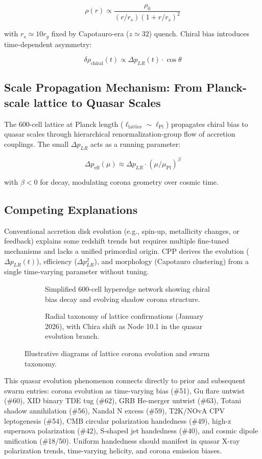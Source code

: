 \documentclass[11pt]{article}
\begin{document}
\[
\rho(r) \propto \frac{\rho_0}{(r/r_s)(1 + r/r_s)^2}
\]

with $r_s \simeq 10 r_g$ fixed by Capotauro-era ($z \simeq 32$) quench. Chiral bias introduces time-dependent asymmetry:

\[
\delta \rho_{\text{chiral}}(t) \propto \Delta p_{LR}(t) \cdot \cos\theta
\]

\subsection{Scale Propagation Mechanism: From Planck-scale lattice to Quasar Scales}
The 600-cell lattice at Planck length ($\ell_{\text{lattice}} \sim \ell_{\text{Pl}}$) propagates chiral bias to quasar scales through hierarchical renormalization-group flow of accretion couplings. The small $\Delta p_{LR}$ acts as a running parameter:

\[
\Delta p_{\text{eff}}(\mu) \approx \Delta p_{LR} \cdot (\mu / \mu_{\text{Pl}})^\beta
\]

with $\beta < 0$ for decay, modulating corona geometry over cosmic time.

\subsection{Competing Explanations}
Conventional accretion disk evolution (e.g., spin-up, metallicity changes, or feedback) explains some redshift trends but requires multiple fine-tuned mechanisms and lacks a unified primordial origin. CPP derives the evolution ($\Delta p_{LR}(t)$), efficiency ($\Delta p_{LR}^2$), and morphology (Capotauro clustering) from a single time-varying parameter without tuning.

\begin{figure}[htbp]
\centering
\begin{subfigure}{0.45\textwidth}
\centering
\caption{Simplified 600-cell hyperedge network showing chiral bias decay and evolving shadow corona structure.}
\label{fig:corona-evo}
\end{subfigure}
\hfill
\begin{subfigure}{0.45\textwidth}
\centering
\caption{Radial taxonomy of lattice confirmations (January 2026), with Chira shift as Node 10.1 in the quasar evolution branch.}
\label{fig:taxonomy}
\end{subfigure}
\caption{Illustrative diagrams of lattice corona evolution and swarm taxonomy.}
\end{figure}

This quasar evolution phenomenon connects directly to prior and subsequent swarm entries: corona evolution as time-varying bias (\#51), Gu flare untwist (\#60), XID binary TDE tug (\#62), GRB He-merger untwist (\#63), Totani shadow annihilation (\#56), Nandal N excess (\#59), T2K/NOvA CPV leptogenesis (\#54), CMB circular polarization handedness (\#49), high-z supernova polarization (\#42), S-shaped jet handedness (\#40), and cosmic dipole unification (\#18/50). Uniform handedness should manifest in quasar X-ray polarization trends, time-varying helicity, and corona emission biases.
\end{document}
